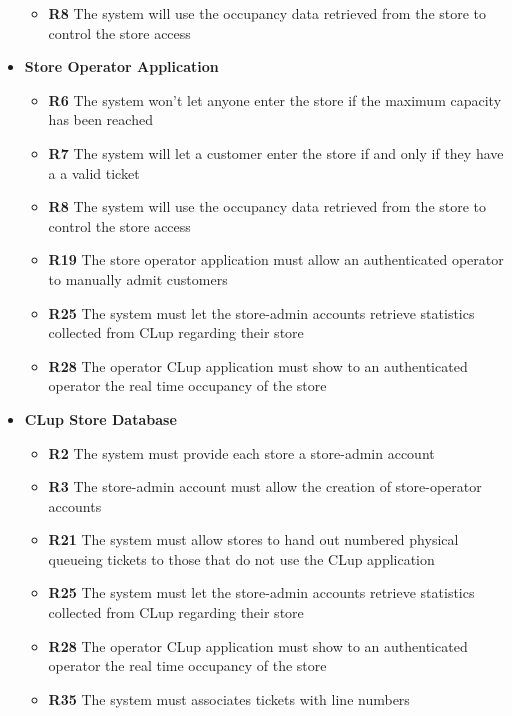 \begin{itemize}
\begin{itemize}
              \item \textbf{R8} The system will use the occupancy data retrieved from the store to control the store access
          \end{itemize}
    \item \colorbox{clup_yellow}{\textbf{Store Operator Application}}
          \begin{itemize}
              \item \textbf{R6} The system won’t let anyone enter the store if the maximum capacity has been reached
              \item \textbf{R7} The system will let a customer enter the store if and only if they have a a valid ticket
              \item \textbf{R8} The system will use the occupancy data retrieved from the store to control the store access
              \item \textbf{R19} The store operator application must allow an authenticated operator to manually admit customers
              \item \textbf{R25} The system must let the store-admin accounts retrieve statistics collected from CLup regarding their store
              \item \textbf{R28} The operator CLup application must show to an authenticated operator the real time occupancy of the store
          \end{itemize}
    \item \colorbox{clup_yellow}{\textbf{CLup Store Database}}
          \begin{itemize}
              \item \textbf{R2} The system must provide each store a store-admin account
              \item \textbf{R3} The store-admin account must allow the creation of store-operator accounts
              \item \textbf{R21} The system must allow stores to hand out numbered physical queueing tickets to those that do not use the CLup application
              \item \textbf{R25} The system must let the store-admin accounts retrieve statistics collected from CLup regarding their store
              \item \textbf{R28} The operator CLup application must show to an authenticated operator the real time occupancy of the store
              \item \textbf{R35} The system must associates tickets with line numbers
          \end{itemize}
\end{itemize}